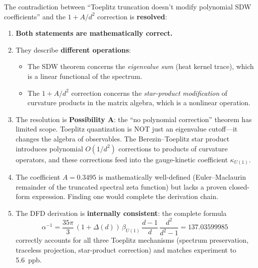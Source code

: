 \documentclass[12pt,a4paper]{article}
\theoremstyle{definition}
\begin{document}
\begin{tcolorbox}[colback=blue!5!white, colframe=blue!50!black,
  title=\textbf{Final Resolution}]

The contradiction between ``Toeplitz truncation doesn't modify polynomial
SDW coefficients'' and the $1+A/d^2$ correction is \textbf{resolved}:

\begin{enumerate}
\item \textbf{Both statements are mathematically correct.}

\item They describe \textbf{different operations}:
  \begin{itemize}
  \item The SDW theorem concerns the \emph{eigenvalue sum}
    (heat kernel trace), which is a linear functional of the spectrum.
  \item The $1+A/d^2$ correction concerns the \emph{star-product
    modification} of curvature products in the matrix algebra,
    which is a nonlinear operation.
  \end{itemize}

\item The resolution is \textbf{Possibility A}: the ``no polynomial
  correction'' theorem has limited scope.  Toeplitz quantization is
  NOT just an eigenvalue cutoff---it changes the algebra of observables.
  The Berezin--Toeplitz star product introduces polynomial $O(1/d^2)$
  corrections to products of curvature operators, and these corrections
  feed into the gauge-kinetic coefficient $\kappa_{U(1)}$.

\item The coefficient $A = 0.3495$ is mathematically well-defined
  (Euler--Maclaurin remainder of the truncated spectral zeta function)
  but lacks a proven closed-form expression.  Finding one would
  complete the derivation chain.

\item The DFD derivation is \textbf{internally consistent}: the complete
  formula
  \[
  \alpha^{-1} = \frac{35\pi}{3}\,(1+\Delta(d))\,\beta_{U(1)}\,
  \frac{d-1}{d}\,\frac{d^2}{d^2-1} = 137.03599985
  \]
  correctly accounts for all three Toeplitz mechanisms (spectrum
  preservation, traceless projection, star-product correction) and
  matches experiment to 5.6~ppb.
\end{enumerate}
\end{tcolorbox}
\end{document}
